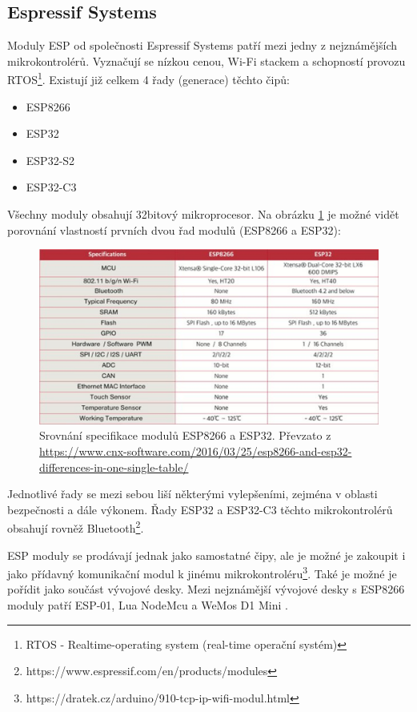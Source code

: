 \subsection*{Espressif Systems}
Moduly ESP od společnosti Espressif Systems patří mezi jedny z nejznámějších mikrokontrolérů. Vyznačují se nízkou cenou, Wi-Fi stackem a schopností provozu RTOS\footnote{RTOS - Realtime-operating system (real-time operační systém)}. Existují již celkem 4 řady (generace) těchto čipů:
\begin{itemize}
    \item ESP8266
    \item ESP32
    \item ESP32-S2
    \item ESP32-C3
\end{itemize}
Všechny moduly obsahují 32bitový mikroprocesor. Na obrázku \ref{ESP-srovnani} je možné vidět porovnání vlastností prvních dvou řad modulů (ESP8266 a ESP32):
\begin{figure}[hbt]
	\centering
	\includegraphics{obrazky/ESP.png}
	\caption{Srovnání specifikace modulů ESP8266 a ESP32. Převzato z \url{https://www.cnx-software.com/2016/03/25/esp8266-and-esp32-differences-in-one-single-table/}}
	\label{ESP-srovnani}
\end{figure}

Jednotlivé řady se mezi sebou liší některými vylepšeními, zejména v oblasti bezpečnosti a dále výkonem. Řady ESP32 a ESP32-C3 těchto mikrokontrolérů obsahují rovněž Bluetooth\footnote{https://www.espressif.com/en/products/modules}.

ESP moduly se prodávají jednak jako samostatné čipy, ale je možné je zakoupit i jako přídavný komunikační modul k jinému mikrokontroléru\footnote{https://dratek.cz/arduino/910-tcp-ip-wifi-modul.html}. Také je možné je pořídit jako součást vývojové desky. Mezi nejznámější vývojové desky s ESP8266 moduly patří ESP-01, Lua NodeMcu a WeMos D1 Mini \cite{BestESP}.

